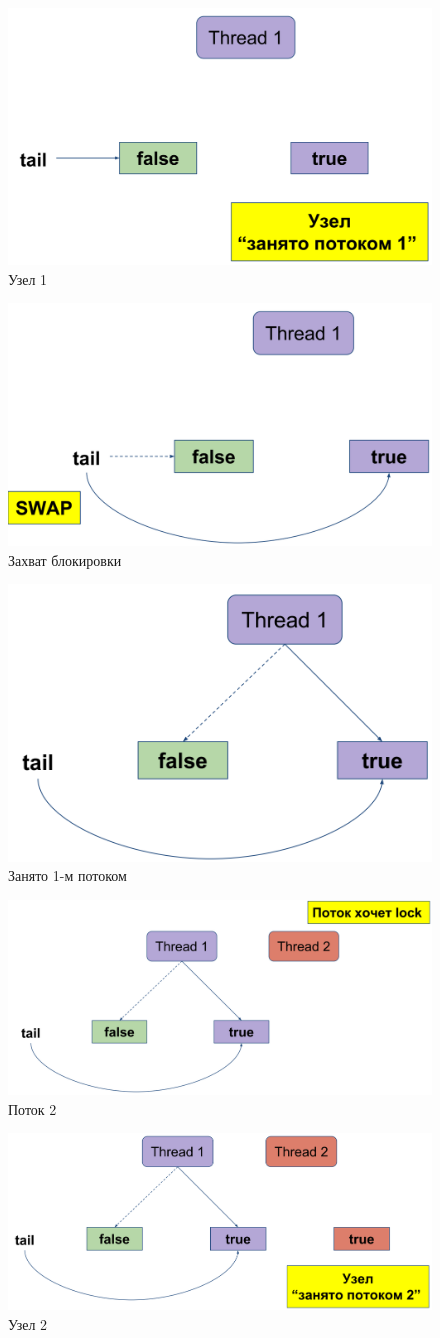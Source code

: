 \documentclass[10pt,a4paper,oneside,titlepage]{article}
\theoremstyle{plain}
\theoremstyle{defenition}
\begin{document}
\begin{figure}[h!]
	\centering
	\includegraphics[width=0.4\linewidth]{pictures/CLH3}
	\caption{Узел 1}
	\label{fig:clh3}
\end{figure}

\begin{figure}[h!]
	\centering
	\includegraphics[width=0.4\linewidth]{pictures/CLH4}
	\caption{Захват блокировки}
	\label{fig:clh4}
\end{figure}

\begin{figure}[h!]
	\centering
	\includegraphics[width=0.4\linewidth]{pictures/CLH5}
	\caption{Занято 1-м потоком}
	\label{fig:clh5}
\end{figure}

\begin{figure}[h!]
	\centering
	\includegraphics[width=0.4\linewidth]{pictures/CLH6}
	\caption{Поток 2}
	\label{fig:clh6}
\end{figure}

\begin{figure}[h!]
	\centering
	\includegraphics[width=0.4\linewidth]{pictures/CLH7}
	\caption{Узел 2}
	\label{fig:clh7}
\end{figure}
\end{document}
